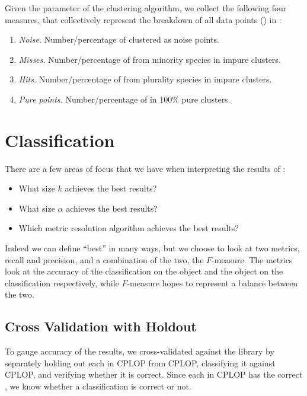 Given the parameter \minneigh{} of the clustering algorithm, we collect the following
four measures, that collectively represent the breakdown of all data points (\isols{}) in \cplop{}:
\begin{enumerate}
    \item \textit{Noise.} Number/percentage of \isols{} clustered as noise points.
    \item \textit{Misses.} Number/percentage of \isols{} from  minority species
    in impure clusters.
     \item \textit{Hits.} Number/percentage of \isols{} from plurality species in
     impure clusters.
     \item \textit{Pure points.} Number/percentage of \isols{} in 100\% pure clusters.
\end{enumerate}

\section{Classification}

There are a few areas of focus that we have when interpreting the results of \krap{}:
\begin{itemize}
\item What size $k$ achieves the best results?
\item What size $\alpha$ achieves the best results?
\item Which metric resolution algorithm achieves the best results?
\end{itemize}
Indeed we can define ``best'' in many ways, but we choose to look at two metrics, recall and precision, and a combination of the two, the $F$-measure. The metrics look at the accuracy of the classification on the object and the object on the classification respectively, while $F$-measure hopes to represent a balance between the two. 

\subsection{Cross Validation with Holdout}
To gauge accuracy of the results, we cross-validated against the library by separately holding out each \isol{} in CPLOP from CPLOP, classifying it against CPLOP, and verifying whether it is correct. Since each \isol{} in CPLOP has the correct \spec{}, we know whether a classification is correct or not.

